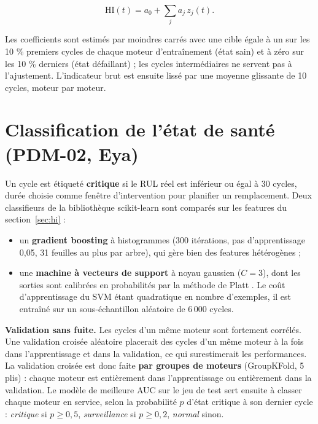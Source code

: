 \begin{equation}\label{eq:hi}
\mathrm{HI}(t) = a_0 + \sum_j a_j\, z_j(t).
\end{equation}

Les coefficients sont estimés par moindres carrés avec une cible égale à un sur les 10 \% premiers cycles de chaque moteur d'entraînement (état sain) et à zéro sur les 10 \% derniers (état défaillant) ; les cycles intermédiaires ne servent pas à l'ajustement. L'indicateur brut est ensuite lissé par une moyenne glissante de 10 cycles, moteur par moteur.

\section{Classification de l'état de santé (PDM-02, Eya)}\label{sec:classification}

Un cycle est étiqueté \textbf{critique} si le RUL réel est inférieur ou égal à 30 cycles, durée choisie comme fenêtre d'intervention pour planifier un remplacement. Deux classifieurs de la bibliothèque scikit-learn \cite{pedregosa2011} sont comparés sur les features du section~\ref{sec:hi} :

\begin{itemize}
\item un \textbf{gradient boosting} à histogrammes \cite{friedman2001,ke2017} (300 itérations, pas d'apprentissage 0,05, 31 feuilles au plus par arbre), qui gère bien des features hétérogènes ;
\item une \textbf{machine à vecteurs de support} à noyau gaussien \cite{cortes1995} ($C = 3$), dont les sorties sont calibrées en probabilités par la méthode de Platt \cite{platt1999}. Le coût d'apprentissage du SVM étant quadratique en nombre d'exemples, il est entraîné sur un sous-échantillon aléatoire de 6\,000 cycles.
\end{itemize}

\textbf{Validation sans fuite.} Les cycles d'un même moteur sont fortement corrélés. Une validation croisée aléatoire placerait des cycles d'un même moteur à la fois dans l'apprentissage et dans la validation, ce qui surestimerait les performances. La validation croisée est donc faite \textbf{par groupes de moteurs} (GroupKFold, 5 plis) : chaque moteur est entièrement dans l'apprentissage ou entièrement dans la validation. Le modèle de meilleure AUC sur le jeu de test sert ensuite à classer chaque moteur en service, selon la probabilité $p$ d'état critique à son dernier cycle : \emph{critique} si $p \ge 0{,}5$, \emph{surveillance} si $p \ge 0{,}2$, \emph{normal} sinon.

